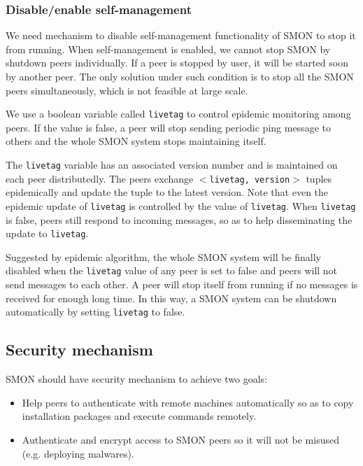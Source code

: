 \subsubsection*{Disable/enable self-management}
\label{subsec:livetag}

We need mechanism to disable self-management functionality
of SMON to stop it from running. When self-management is
enabled, we cannot stop SMON by shutdown peers individually.
If a peer is stopped by user, it will be started soon by
another peer. The only solution under such condition is to
stop all the SMON peers simultaneously, which is not
feasible at large scale.

We use a boolean variable called \texttt{livetag} to control epidemic
monitoring among peers. If the value is false, a peer will
stop sending periodic ping message to others and the whole
SMON system stops maintaining itself. 

The \texttt{livetag} variable has an associated version
number and is maintained on each peer distributedly. The
peers exchange \texttt{$<$livetag, version$>$} tuples
epidemically and update the tuple to the latest version.
Note that even the epidemic update of \texttt{livetag} is
controlled by the value of \texttt{livetag}.  When
\texttt{livetag} is false, peers still respond
to incoming messages, so as to
help disseminating the update to \texttt{livetag}.

Suggested by epidemic algorithm, the whole SMON system will
be finally disabled when the \texttt{livetag} value of any
peer is set to false and peers will not send messages to
each other. A peer will stop itself from running if no
messages is received for enough long time. In this way, a
SMON system can be shutdown automatically by setting
\texttt{livetag} to false.





\subsection{Security mechanism}
\label{subsec:security}

SMON should have security mechanism to achieve two goals:

\begin{itemize}

  \item Help peers to authenticate with remote machines
  automatically so as to copy installation packages and
  execute commands remotely.

  \item Authenticate and encrypt access to SMON peers so it
  will not be misused (e.g. deploying malwares).

\end{itemize}

